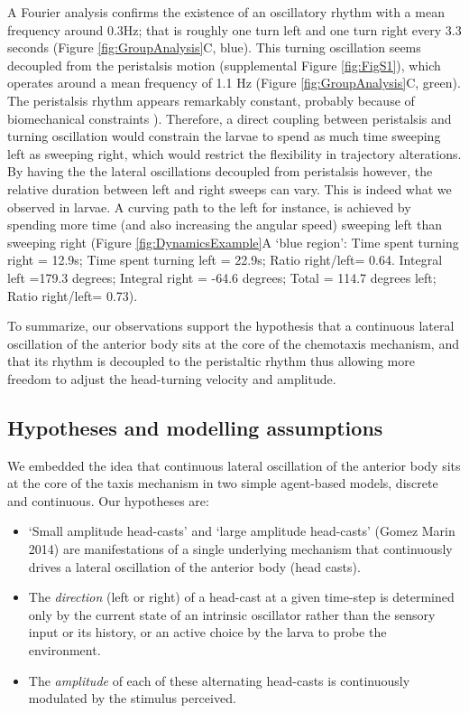 \documentclass[11pt,a4paper]{article}
\begin{document}
A Fourier analysis confirms the existence of an oscillatory rhythm with a mean frequency around 0.3Hz; that is roughly one turn left and one turn right every 3.3 seconds (Figure \ref{fig:GroupAnalysis}C, blue). This turning oscillation seems decoupled from the peristalsis motion (supplemental Figure \ref{fig:FigS1}), which operates around a mean frequency of 1.1 Hz (Figure \ref{fig:GroupAnalysis}C, green). The peristalsis rhythm appears remarkably constant,  probably because of biomechanical constraints \citep{ross2015model}). Therefore, a direct coupling between peristalsis and turning oscillation would constrain the larvae to spend as much time sweeping left as sweeping right, which would restrict the flexibility in trajectory alterations. By having the the lateral oscillations decoupled from peristalsis however, the relative duration between left and right sweeps can vary. This is indeed what we observed in larvae. A curving path to the left for instance, is achieved by spending more time (and also increasing the angular speed) sweeping left than sweeping right (Figure \ref{fig:DynamicsExample}A ‘blue region’:  Time spent turning right = 12.9s; Time spent turning left = 22.9s; Ratio right/left= 0.64. Integral left =179.3 degrees; Integral right = -64.6 degrees; Total = 114.7 degrees left; Ratio right/left= 0.73).

To summarize, our observations support the hypothesis that a continuous lateral oscillation of the anterior body sits at the core of the chemotaxis mechanism, and that its rhythm is decoupled to the peristaltic rhythm thus allowing more freedom to adjust the head-turning velocity and amplitude.


\subsection{Hypotheses and modelling assumptions}

We embedded the idea that continuous lateral oscillation of the anterior body sits at the core of the taxis mechanism in two simple agent-based models, discrete and continuous. Our hypotheses are:

\begin{itemize}

\item ‘Small amplitude head-casts’ and ‘large amplitude head-casts’ (Gomez Marin 2014) are manifestations of a single underlying mechanism that continuously drives a lateral oscillation of the anterior body (head casts). 

\item The {\it direction} (left or right) of a head-cast at a given time-step is determined only by the current state of an intrinsic oscillator rather than the sensory input or its history, or an active choice by the larva to probe the environment.

\item The {\it amplitude} of each of these alternating head-casts is continuously modulated by the stimulus perceived.

\end{itemize}
\end{document}
